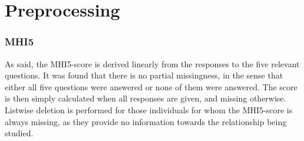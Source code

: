 \begin{figure}[htbp]
    \caption{Distributions of the MHI5-score and sports engagement across years}
    \label{fig:data:sample_moments_y_x}
    \begin{subfigure}[t]{0.49\textwidth}
        \centering
        
        \vspace{0.1em}
    \end{subfigure}
    \hfill
    \begin{subfigure}[t]{0.49\textwidth}
        \centering
        
        \vspace{0.1em}
    \end{subfigure}
\end{figure}

\section{Preprocessing}
\label{sec:data:preprocessing}
\subsubsection{MHI5}
As said, the MHI5-score is derived linearly from the responses to the five relevant questions. It was found that
there is no partial missingness, in the sense that either all five questions were answered or none of them were answered.
The score is then simply calculated when all responses are given, and missing otherwise.
Listwise deletion is performed for those individuals for whom the MHI5-score is always missing, as they provide no
information towards the relationship being studied.

